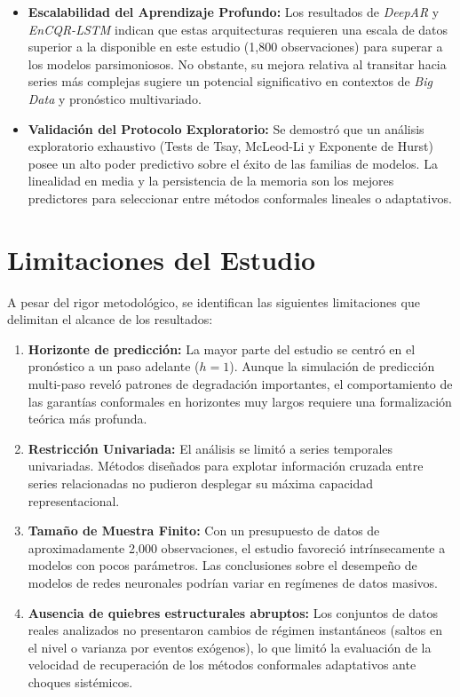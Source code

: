 \begin{itemize}
    \item \textbf{Escalabilidad del Aprendizaje Profundo:} Los resultados de \textit{DeepAR} y \textit{EnCQR-LSTM} indican que estas arquitecturas requieren una escala de datos superior a la disponible en este estudio (1,800 observaciones) para superar a los modelos parsimoniosos. No obstante, su mejora relativa al transitar hacia series más complejas sugiere un potencial significativo en contextos de \textit{Big Data} y pronóstico multivariado.
    
    \item \textbf{Validación del Protocolo Exploratorio:} Se demostró que un análisis exploratorio exhaustivo (Tests de Tsay, McLeod-Li y Exponente de Hurst) posee un alto poder predictivo sobre el éxito de las familias de modelos. La linealidad en media y la persistencia de la memoria son los mejores predictores para seleccionar entre métodos conformales lineales o adaptativos.
\end{itemize}

\section{Limitaciones del Estudio}

A pesar del rigor metodológico, se identifican las siguientes limitaciones que delimitan el alcance de los resultados:

\begin{enumerate}
    \item \textbf{Horizonte de predicción:} La mayor parte del estudio se centró en el pronóstico a un paso adelante ($h=1$). Aunque la simulación de predicción multi-paso reveló patrones de degradación importantes, el comportamiento de las garantías conformales en horizontes muy largos requiere una formalización teórica más profunda.
    
    \item \textbf{Restricción Univariada:} El análisis se limitó a series temporales univariadas. Métodos diseñados para explotar información cruzada entre series relacionadas no pudieron desplegar su máxima capacidad representacional.
    
    \item \textbf{Tamaño de Muestra Finito:} Con un presupuesto de datos de aproximadamente 2,000 observaciones, el estudio favoreció intrínsecamente a modelos con pocos parámetros. Las conclusiones sobre el desempeño de modelos de redes neuronales podrían variar en regímenes de datos masivos.
    
    \item \textbf{Ausencia de quiebres estructurales abruptos:} Los conjuntos de datos reales analizados no presentaron cambios de régimen instantáneos (saltos en el nivel o varianza por eventos exógenos), lo que limitó la evaluación de la velocidad de recuperación de los métodos conformales adaptativos ante choques sistémicos.
\end{enumerate}

